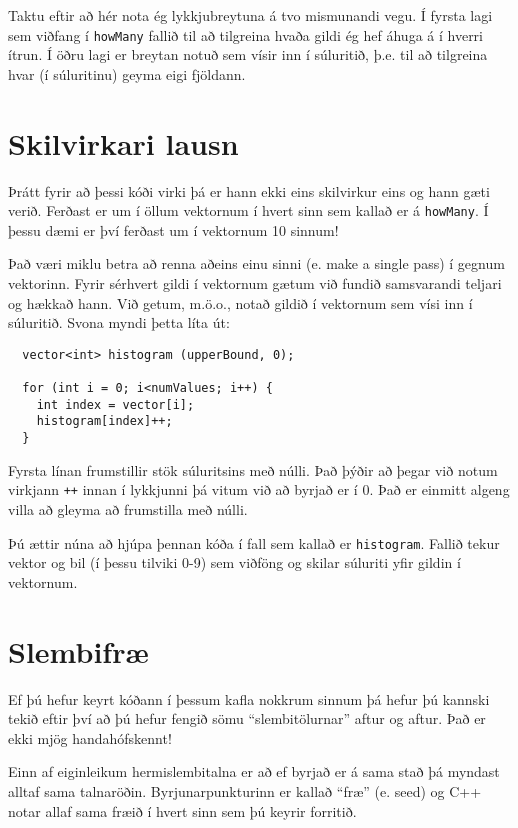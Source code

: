 
Taktu eftir að hér nota ég lykkjubreytuna á tvo mismunandi vegu.
Í fyrsta lagi sem viðfang í {\tt howMany} fallið til að tilgreina hvaða gildi ég hef áhuga á í hverri ítrun.
Í öðru lagi er breytan notuð sem vísir inn í súluritið, þ.e. til að tilgreina hvar (í súluritinu) geyma eigi fjöldann.

\section{Skilvirkari lausn}

Þrátt fyrir að þessi kóði virki þá er hann ekki eins skilvirkur eins og hann gæti verið.
Ferðast er um í öllum vektornum í hvert sinn sem kallað er á {\tt howMany}.
Í þessu dæmi er því ferðast um í vektornum 10 sinnum!

Það væri miklu betra að renna aðeins einu sinni (e. make a single pass) í gegnum vektorinn.
Fyrir sérhvert gildi í vektornum gætum við fundið samsvarandi teljari og hækkað hann.
Við getum, m.ö.o., notað gildið í vektornum sem vísi inn í súluritið.
Svona myndi þetta líta út:

\begin{verbatim}
  vector<int> histogram (upperBound, 0);

  for (int i = 0; i<numValues; i++) {
    int index = vector[i];
    histogram[index]++;
  }
\end{verbatim}
%
Fyrsta línan frumstillir stök súluritsins með núlli.
Það þýðir að þegar við notum virkjann {\tt ++} innan í lykkjunni þá vitum við að byrjað er í 0.
Það er einmitt algeng villa að gleyma að frumstilla með núlli.

Þú ættir núna að hjúpa þennan kóða í fall sem kallað er {\tt histogram}.
Fallið tekur vektor og bil (í þessu tilviki 0-9) sem viðföng og skilar súluriti yfir gildin í vektornum.

\section{Slembifræ}

Ef þú hefur keyrt kóðann í þessum kafla nokkrum sinnum þá hefur þú kannski tekið eftir því að þú hefur fengið sömu ``slembitölurnar'' aftur og aftur.
Það er ekki mjög handahófskennt!

Einn af eiginleikum hermislembitalna er að ef byrjað er á sama stað þá myndast alltaf sama talnaröðin.
Byrjunarpunkturinn er kallað ``fræ'' (e. seed) og C++ notar allaf sama fræið í hvert sinn sem þú keyrir forritið.


